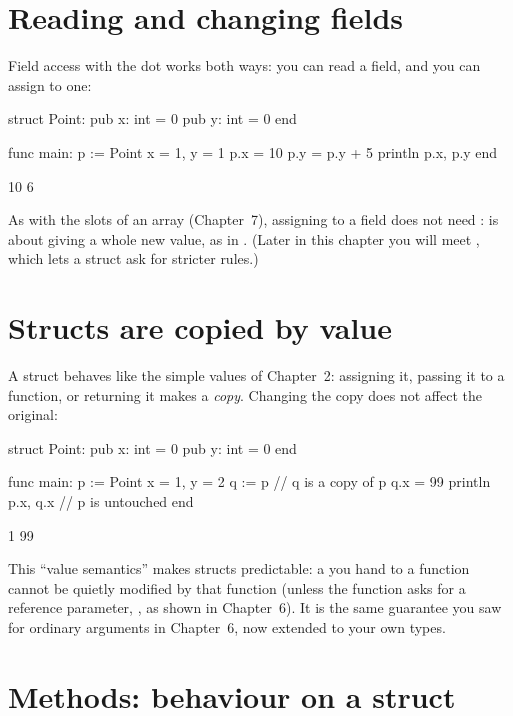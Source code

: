 \section{Reading and changing fields}

Field access with the dot works both ways: you can read a  field, and
you can assign to one:

\begin{salamen}
struct Point:
    pub x: int = 0
    pub y: int = 0
end

func main:
    p := Point { x = 1, y = 1 }
    p.x = 10
    p.y = p.y + 5
    println p.x, p.y
end
\end{salamen}

\begin{progout}
10 6
\end{progout}

As with the slots of an array (Chapter~7), assigning to a field does not need
:  is about giving  a whole new value, as in
. (Later in this chapter you will meet ,
which lets a struct ask for stricter rules.)

\section{Structs are copied by value}

A struct behaves like the simple values of Chapter~2: assigning it, passing it to
a function, or returning it makes a \emph{copy}. Changing the copy does not affect
the original:

\begin{salamen}
struct Point:
    pub x: int = 0
    pub y: int = 0
end

func main:
    p := Point { x = 1, y = 2 }
    q := p                 // q is a copy of p
    q.x = 99
    println p.x, q.x       // p is untouched
end
\end{salamen}

\begin{progout}
1 99
\end{progout}

This ``value semantics'' makes structs predictable: a  you hand to a
function cannot be quietly modified by that function (unless the function asks
for a reference parameter, \code{\&:}, as shown in Chapter~6). It is the same guarantee you
saw for ordinary arguments in Chapter~6, now extended to your own types.

\section{Methods: behaviour on a struct}

